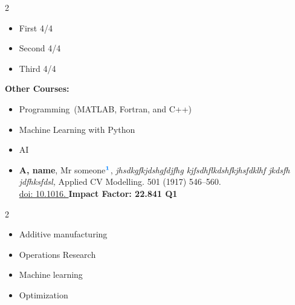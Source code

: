 \documentclass{article}
\begin{document}
\begin{multicols}{2}
	\begin{itemize}
		\item First 4/4
	  	\item Second 4/4
	  	\item Third 4/4
	 
	
       \end{itemize}
		\textbf{Other Courses:}
	{\footnotesize 	\begin{itemize}
		\item Programming~(MATLAB, Fortran, and C++)
	
	   	\item Machine Learning with Python
            \item AI

		\end{itemize}
			}	
\end{multicols}



\begin{itemize}
\item[2017] \textbf{A, name}, Mr someone$ ^{\textcolor[rgb]{0.00,0.50,1.00}{\textbf{1}}} $, \textit{jhsdkgfkjdshgfdjfhg kjfsdhflkdshfkjhsfdklhf jkdsfh jdfhksfdsl,} Applied CV Modelling. 501 (1917) 546--560. \\	\href{https://doi.org}{{\selectfont
 		\textcolor[rgb]{0.00,0.00,0.55}{doi: 10.1016. }}} \hfill \textbf{{\footnotesize Impact Factor: 22.841 Q1}}
 		


\end{itemize}


\begin{multicols}{2}
\begin{itemize}
 
 \item Additive manufacturing
  \item Operations Research
 \item Machine learning
  \item Optimization
\end{itemize}
\end{multicols}
\end{document}
